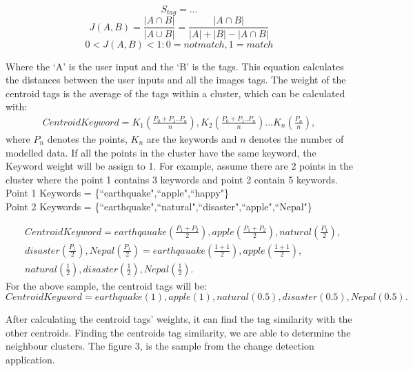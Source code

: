 \documentclass[runningheads,a4paper]{llncs}
\begin{document}
\begin{equation}\label{eq:JAAAAC}
S_{tag} = ...
\end{equation} 
\begin{equation}\label{eq:JAAAAC}
 J(A,B) = \frac{|A\cap B|}{|A\cup B|} = \frac{|A\cap B|}{|A|+|B|-|A\cap B|}
\end{equation} 
\begin{equation}
0< J(A,B) <1 : 0 = not match, 1 = match 
\end{equation} 

Where the `A' is the user input and the `B' is the tags. This equation calculates the distances between the user inputs and all the images tags. The weight of the centroid tags is the average of the tags within a cluster, which can be calculated with:
\begin{eqnarray}
CentroidKeyword = K_1(\frac{P_0+P_1..P_n}{n}),K_2(\frac{P_0+P_1..P_n}{n}) ...K_n(\frac{P_n}{n}),
\end{eqnarray}
where $P_n$ denotes the points, $K_n$ are the keywords and $n$ denotes the number of modelled data. If all the points in the cluster have the same keyword, the Keyword weight will be assign to 1. For example, assume there are 2 points in the cluster where the point 1 contains 3 keywords and point 2 contain 5 keywords.\\
Point 1 Keywords = \{``earthquake",``apple",``happy"\}\\
Point 2 Keywords = \{``earthquake",``natural",``disaster",``apple",``Nepal"\}

\begin{eqnarray}\label{eq:pareto mle2}
&CentroidKeyword = earthqauake(\frac{P_1+P_2}{2}), apple(\frac{P_1+P_2}{2}),natural(\frac{P_1}{2}), \nonumber\\ &disaster(\frac{P_1}{2}), Nepal(\frac{P_1}{2})= earthqauake(\frac{1+1}{2}), apple(\frac{1+1}{2}), \nonumber\\
&natural(\frac{1}{2}),disaster(\frac{1}{2}),Nepal(\frac{1}{2}) .
\end{eqnarray}
For the above sample, the centroid tags will be:
\begin{displaymath}
CentroidKeyword = earthquake(1), apple(1), natural(0.5), disaster(0.5), Nepal(0.5).
\end{displaymath}

After calculating the centroid tags' weights, it can find the tag similarity with the other centroids. Finding the centroids tag similarity, we are able to determine the neighbour clusters. The figure 3, is the sample from the change detection application.
\end{document}

